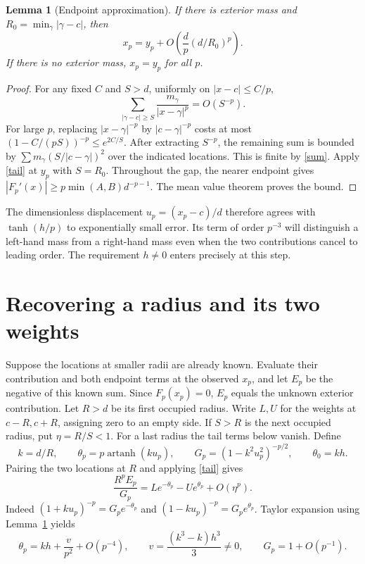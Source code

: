 \documentclass[11pt,letterpaper]{article}
\newtheorem{lemma}[theorem]{Lemma}
\newcommand{\atanh}{\operatorname{artanh}}
\numberwithin{equation}{section}
\begin{document}
\begin{lemma}[Endpoint approximation]\label{endpoint}
If there is exterior mass and $R_0=\min_\gamma|\gamma-c|$, then
\[
        x_p=y_p+O\!\left(\frac{d}{p}(d/R_0)^p\right).
\]
If there is no exterior mass, $x_p=y_p$ for all $p$.
\end{lemma}
\begin{proof}
For any fixed $C$ and $S>d$, uniformly on $|x-c|\le C/p$,
\begin{equation}\label{tail}
 \sum_{|\gamma-c|\ge S}\frac{m_\gamma}{|x-\gamma|^p}=O(S^{-p}).
\end{equation}
For large $p$, replacing $|x-\gamma|^{-p}$ by $|c-\gamma|^{-p}$
costs at most $(1-C/(pS))^{-p}\le e^{2C/S}$. After extracting $S^{-p}$,
the remaining sum is bounded by $\sum m_\gamma(S/|c-\gamma|)^2$ over
the indicated locations. This is finite by \eqref{sum}. Apply \eqref{tail}
at $y_p$ with $S=R_0$. Throughout the gap, the nearer endpoint gives
$|F_p'(x)|\ge p\min(A,B)d^{-p-1}$. The mean value theorem proves the bound.
\end{proof}

The dimensionless displacement $u_p=(x_p-c)/d$ therefore agrees with
$\tanh(h/p)$ to exponentially small error. Its term of order $p^{-3}$
will distinguish a left-hand mass from a right-hand mass even when the
two contributions cancel to leading order. The requirement $h\ne0$
enters precisely at this step.
\newpage
\section{Recovering a radius and its two weights}
Suppose the locations at smaller radii are already known. Evaluate their
contribution and both endpoint terms at the observed $x_p$, and let $E_p$
be the negative of this known sum. Since $F_p(x_p)=0$, $E_p$ equals the
unknown exterior contribution. Let $R>d$ be its first occupied radius.
Write $L,U$ for the weights at $c-R,c+R$, assigning zero to an empty side.
If $S>R$ is the next occupied radius, put $\eta=R/S<1$. For a last radius
the tail terms below vanish. Define
\begin{equation}\label{polar}
 k=d/R,\qquad \theta_p=p\atanh(ku_p),\qquad
 G_p=(1-k^2u_p^2)^{-p/2},\qquad \theta_0=kh.
\end{equation}
Pairing the two locations at $R$ and applying \eqref{tail} gives
\begin{equation}\label{shell}
        \frac{R^pE_p}{G_p}
          =L e^{-\theta_p}-Ue^{\theta_p}+O(\eta^p).
\end{equation}
Indeed $(1+ku_p)^{-p}=G_p e^{-\theta_p}$ and $(1-ku_p)^{-p}=G_p e^{\theta_p}$.
Taylor expansion using Lemma~\ref{endpoint} yields
\begin{equation}\label{theta}
 \theta_p=kh+\frac{v}{p^2}+O(p^{-4}),\qquad
 v=\frac{(k^3-k)h^3}{3}\ne0,\qquad G_p=1+O(p^{-1}).
\end{equation}
\end{document}
